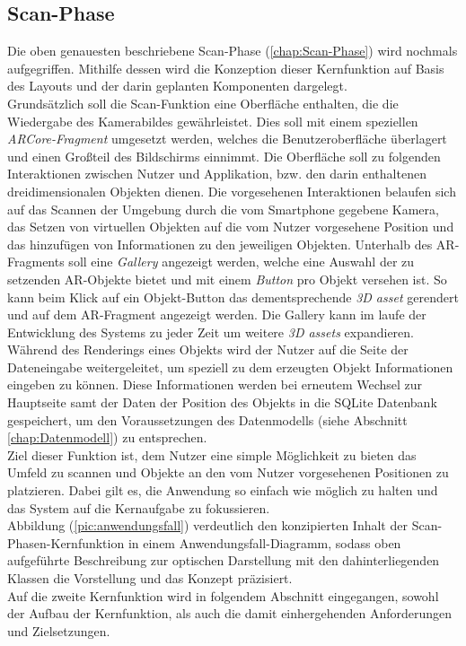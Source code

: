 \subsection*{Scan-Phase}
Die oben genauesten beschriebene Scan-Phase (\ref{chap:Scan-Phase}) wird nochmals aufgegriffen. Mithilfe dessen wird die Konzeption dieser 
Kernfunktion auf Basis des Layouts und der darin geplanten Komponenten dargelegt.
\\ 
Grundsätzlich soll die Scan-Funktion eine Oberfläche enthalten, die die Wiedergabe des Kamerabildes gewährleistet. Dies soll mit einem 
speziellen \textit{ARCore-Fragment} umgesetzt werden, welches die Benutzeroberfläche überlagert und einen Großteil des Bildschirms einnimmt. 
Die Oberfläche soll zu folgenden Interaktionen zwischen Nutzer und Applikation, bzw. den darin enthaltenen dreidimensionalen Objekten 
dienen. Die vorgesehenen Interaktionen belaufen sich auf das Scannen der Umgebung durch die vom Smartphone gegebene Kamera, das Setzen von 
virtuellen Objekten auf die vom Nutzer vorgesehene Position und das hinzufügen von Informationen zu den jeweiligen Objekten. Unterhalb des 
\acs{AR}-Fragments soll eine \textit{Gallery} angezeigt werden, welche eine Auswahl der zu setzenden \acs{AR}-Objekte bietet und mit einem 
\textit{Button} pro Objekt versehen ist. So kann beim Klick auf ein Objekt-Button das dementsprechende \textit{3D asset} gerendert und auf 
dem \acs{AR}-Fragment angezeigt werden. Die Gallery kann im laufe der Entwicklung des Systems zu jeder Zeit um weitere \textit{3D assets} 
expandieren. Während des Renderings eines Objekts wird der Nutzer auf die Seite der Dateneingabe weitergeleitet, um speziell zu dem 
erzeugten Objekt Informationen eingeben zu können. Diese Informationen werden bei erneutem Wechsel zur 
Hauptseite samt der Daten der Position des Objekts in die SQLite Datenbank gespeichert, um den Voraussetzungen des Datenmodells 
(siehe Abschnitt \ref{chap:Datenmodell}) zu entsprechen.
\\
Ziel dieser Funktion ist, dem Nutzer eine simple Möglichkeit zu bieten das Umfeld zu scannen und Objekte an den vom Nutzer vorgesehenen 
Positionen zu platzieren. Dabei gilt es, die Anwendung so einfach wie möglich zu halten und das System auf die Kernaufgabe zu fokussieren.
\\ 
Abbildung (\ref{pic:anwendungsfall}) verdeutlich den konzipierten Inhalt der Scan-Phasen-Kernfunktion in einem Anwendungsfall-Diagramm, 
sodass oben aufgeführte Beschreibung zur optischen Darstellung mit den dahinterliegenden Klassen die Vorstellung und das Konzept präzisiert.
\\ 
\linebreak
Auf die zweite Kernfunktion wird in folgendem Abschnitt eingegangen, sowohl der Aufbau der Kernfunktion, als auch die damit einhergehenden 
Anforderungen und Zielsetzungen.
